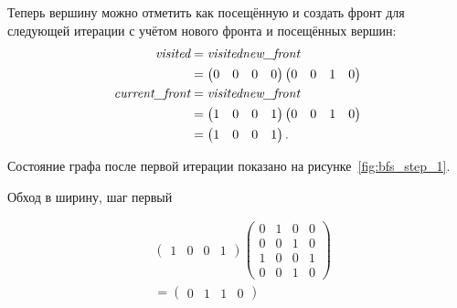 \begin{example}
    Теперь вершину  можно отметить как посещённую и создать фронт для следующей итерации с учётом нового фронта и посещённых вершин:
    \begin{align*}
        \emph{visited}        & = \emph{visited} \emph{new\_front} \\
                                & =
        \begin{pmatrix}
            0 & 0 & 0 & 0
        \end{pmatrix}
        \begin{pmatrix}
            0 & 0 & 1 & 0
        \end{pmatrix}
        \\
        \emph{current\_front} & = \emph{visited} \emph{new\_front}
        \\
                                & =
        \begin{pmatrix}
            1 & 0 & 0 & 1
        \end{pmatrix}
        \begin{pmatrix}
            0 & 0 & 1 & 0
        \end{pmatrix}                                             \\
                                & =
        \begin{pmatrix}
            1 & 0 & 0 & 1
        \end{pmatrix}.
    \end{align*}

    Состояние графа после первой итерации показано на рисунке~\ref{fig:bfs_step_1}.
    \begin{marginfigure}
        \begin{center}
            \scalebox{0.8}{}
        \end{center}
        \caption{Обход в ширину, шаг первый}
        \label{fig:bfs_step_1}
    \end{marginfigure}

    \begin{align*}
        & \begin{pmatrix}
             1 & 0 & 0 & 1
         \end{pmatrix}
       \begin{pmatrix}
          0 & 1 & 0 & 0 \\
          0 & 0 & 1 & 0 \\
          1 & 0 & 0 & 1 \\
          0 & 0 & 1 & 0
      \end{pmatrix}    \\ &=
       \begin{pmatrix}
          0 & 1 & 1 & 0
      \end{pmatrix}
   \end{align*}


\end{example}
